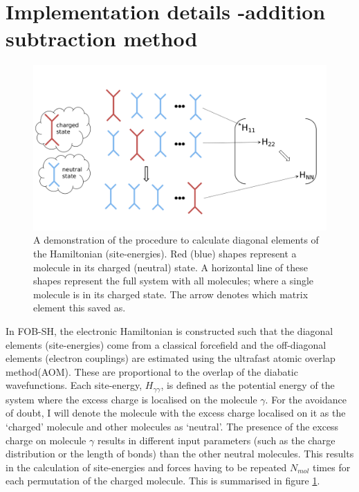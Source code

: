 \section{Implementation details -addition subtraction method}
\label{sect:addSubMethod}
\begin{figure}[ht]
  \includegraphics[width=\textwidth]{./img/ES/ForceEnerCalc.png}
  \caption{\label{fig:FE_Calc}A demonstration of the procedure to calculate diagonal elements of the Hamiltonian (site-energies). Red (blue) shapes represent a molecule in its charged (neutral) state. A  horizontal line of these shapes represent the full system with all molecules; where a single molecule is in its charged state. The arrow denotes which matrix element this saved as.}
\end{figure}
\noindent In FOB-SH, the electronic Hamiltonian is constructed such that the diagonal elements (site-energies) come from a classical forcefield and the off-diagonal elements (electron couplings) are estimated using the ultrafast atomic overlap method(AOM). These are proportional to the overlap of the diabatic wavefunctions. Each site-energy, $H_{\gamma \gamma}$, is defined as the potential energy of the system where the excess charge is localised on the molecule $\gamma$. For the avoidance of doubt, I will denote the molecule with the excess charge localised on it as the `charged' molecule and other molecules as `neutral'. The presence of the excess charge on molecule $\gamma$ results in different input parameters (such as the charge distribution or the length of bonds) than the other neutral molecules. This results in the calculation of site-energies and forces having to be repeated $N_{mol}$ times for each permutation of the charged molecule. This is summarised in figure \ref{fig:FE_Calc}. 
\\\\
